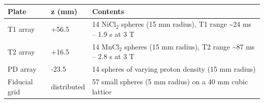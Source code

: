 \begin{longtable}[]{@{}lll@{}}
\toprule
\begin{minipage}[b]{0.26\columnwidth}\raggedright
Plate\strut
\end{minipage} & \begin{minipage}[b]{0.29\columnwidth}\raggedright
z (mm)\strut
\end{minipage} & \begin{minipage}[b]{0.37\columnwidth}\raggedright
Contents\strut
\end{minipage}\tabularnewline
\midrule
\endhead
\begin{minipage}[t]{0.26\columnwidth}\raggedright
T1 array\strut
\end{minipage} & \begin{minipage}[t]{0.29\columnwidth}\raggedright
+56.5\strut
\end{minipage} & \begin{minipage}[t]{0.37\columnwidth}\raggedright
14 NiCl\(_2\) spheres (15 mm radius), T1 range \textasciitilde24 ms -- 1.9 s
at 3 T\strut
\end{minipage}\tabularnewline
\begin{minipage}[t]{0.26\columnwidth}\raggedright
T2 array\strut
\end{minipage} & \begin{minipage}[t]{0.29\columnwidth}\raggedright
+16.5\strut
\end{minipage} & \begin{minipage}[t]{0.37\columnwidth}\raggedright
14 MnCl\(_2\) spheres (15 mm radius), T2 range \textasciitilde87 ms -- 2.8 s
at 3 T\strut
\end{minipage}\tabularnewline
\begin{minipage}[t]{0.26\columnwidth}\raggedright
PD array\strut
\end{minipage} & \begin{minipage}[t]{0.29\columnwidth}\raggedright
-23.5\strut
\end{minipage} & \begin{minipage}[t]{0.37\columnwidth}\raggedright
14 spheres of varying proton density (15 mm radius)\strut
\end{minipage}\tabularnewline
\begin{minipage}[t]{0.26\columnwidth}\raggedright
Fiducial grid\strut
\end{minipage} & \begin{minipage}[t]{0.29\columnwidth}\raggedright
distributed\strut
\end{minipage} & \begin{minipage}[t]{0.37\columnwidth}\raggedright
57 small spheres (5 mm radius) on a 40 mm cubic lattice\strut
\end{minipage}\tabularnewline
\bottomrule
\end{longtable}

